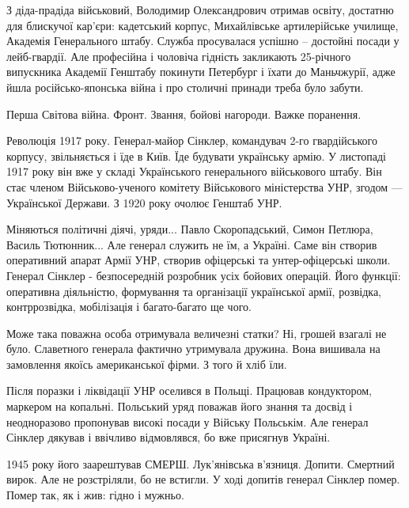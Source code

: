 З діда-прадіда військовий, Володимир Олександрович отримав освіту, достатню для
блискучої кар’єри: кадетський корпус, Михайлівське артилерійське училище,
Академія Генерального штабу. Служба просувалася успішно – достойні посади у
лейб-гвардії. Але професійна і чоловіча гідність закликають 25-річного
випускника Академії Генштабу покинути Петербург і їхати до Маньчжурії, адже
йшла російсько-японська війна і про столичні принади треба було забути.

Перша Світова війна. Фронт. Звання, бойові нагороди. Важке поранення. 

Революція 1917 року. Генерал-майор Сінклер, командувач 2-го гвардійського
корпусу, звільняється і їде в Київ. Їде будувати українську армію. У листопаді
1917 року він вже у складі Українського генерального військового штабу. Він
стає членом Військово-ученого комітету Військового міністерства УНР, згодом —
Української Держави. З 1920 року очолює Генштаб УНР. 

Міняються політичні діячі, уряди... Павло Скоропадський, Симон Петлюра, Василь
Тютюнник... Але генерал служить не їм, а Україні. Саме він створив оперативний
апарат Армії УНР, створив офіцерські та унтер-офіцерські школи. Генерал Сінклер
- безпосередній розробник усіх бойових операцій. Його функції: оперативна
діяльністю, формування та організації української армії, розвідка,
контррозвідка, мобілізація і багато-багато ще чого. 

Може така поважна особа отримувала величезні статки? Ні, грошей взагалі не
було. Славетного генерала фактично утримувала дружина. Вона вишивала на
замовлення якоїсь американської фірми. З того й хліб їли. 

Після поразки і ліквідації УНР оселився в Польщі. Працював кондуктором,
маркером на копальні. Польський уряд поважав його знання та досвід і
неодноразово пропонував високі посади у Війську Польськім. Але генерал Сінклер
дякував і ввічливо відмовлявся, бо вже присягнув Україні. 

1945 року його заарештував СМЕРШ. Лук’янівська в’язниця. Допити. Смертний
вирок. Але не розстріляли, бо не встигли. У ході допитів генерал Сінклер помер.
Помер так, як і жив: гідно і мужньо.

